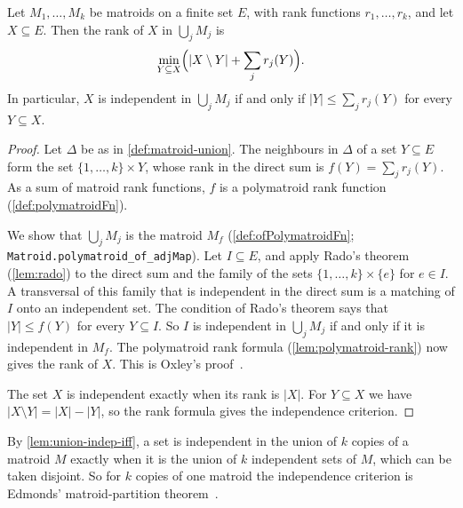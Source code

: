 \begin{theorem}
  \label{thm:matroid-partition-rank}
  \leanok
  Let $M_1, \dots, M_k$ be matroids on a finite set $E$, with rank
  functions $r_1, \dots, r_k$, and let $X \subseteq E$. Then the rank
  of $X$ in $\bigcup_j M_j$ is
  \[
    \min_{Y \subseteq X} \Bigl(|X \setminus Y| + \sum_{j} r_j(Y)\Bigr).
  \]
  In particular, $X$ is independent in $\bigcup_j M_j$ if and only if
  $|Y| \le \sum_j r_j(Y)$ for every $Y \subseteq X$.
\end{theorem}
\begin{proof}
  \leanok
  Let $\Delta$ be as in \cref{def:matroid-union}. The neighbours in
  $\Delta$ of a set $Y \subseteq E$ form the set
  $\{1, \dots, k\} \times Y$, whose rank in the direct sum is
  $f(Y) = \sum_j r_j(Y)$. As a sum of matroid rank
  functions, $f$ is a polymatroid rank function
  (\cref{def:polymatroidFn}).

  We show that $\bigcup_j M_j$ is the matroid $M_f$
  (\cref{def:ofPolymatroidFn}; \texttt{Matroid.\allowbreak{}polymatroid\_\allowbreak{}of\_\allowbreak{}adjMap}).
  Let $I \subseteq E$, and apply Rado's theorem (\cref{lem:rado}) to the
  direct sum and the family of the sets $\{1, \dots, k\} \times \{e\}$
  for $e \in I$. A transversal of this family that is independent in
  the direct sum is a matching of $I$ onto an independent set. The
  condition of Rado's theorem says that $|Y| \le f(Y)$ for every
  $Y \subseteq I$. So $I$ is independent in $\bigcup_j M_j$ if and only
  if it is independent in $M_f$. The polymatroid rank formula
  (\cref{lem:polymatroid-rank}) now gives the rank of $X$. This is
  Oxley's proof~\cite[Lemma~11.2.13 and Theorem~11.3.1]{oxley2011}.

  The set $X$ is independent exactly when its rank is $|X|$. For
  $Y \subseteq X$ we have $|X \setminus Y| = |X| - |Y|$, so the rank
  formula gives the independence criterion.
\end{proof}

By \cref{lem:union-indep-iff}, a set is independent in the union of
$k$ copies of a matroid $M$ exactly when it is the union of $k$
independent sets of $M$, which can be taken disjoint. So for $k$ copies
of one matroid the independence criterion is Edmonds' matroid-partition
theorem~\cite[Theorem~1]{edmonds1965}.

